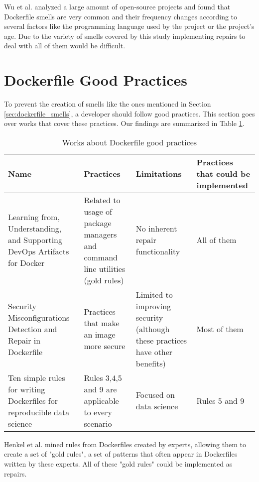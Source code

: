 Wu et al. \cite{wuCharacterizingOccurrenceDockerfile2020} analyzed a large amount of open-source projects and found that Dockerfile smells are very common and their frequency changes according to several factors like the programming language used by the project or the project's age. Due to the variety of smells covered by this study implementing repairs to deal with all of them would be difficult.

\section{Dockerfile Good Practices} \label{sec:dockerfile_good_practices}

To prevent the creation of smells like the ones mentioned in Section \ref{sec:dockerfile_smells}, a developer should follow good practices. This section goes over works that cover these practices. Our findings are summarized in Table \ref{tab:works_dockerfile_good_practices}.

\begin{table}[H]
    \centering
    \begin{tabular}{|p{}|p{}|p{}|p{}|}
        \hline \textbf{Name} & \textbf{Practices} & \textbf{Limitations} & \textbf{Practices that could be implemented} \\
        \hline Learning from, Understanding, and Supporting DevOps Artifacts for Docker \cite{henkelLearningUnderstandingSupporting2020} & Related to usage of package managers and command line utilities (gold rules) & No inherent repair functionality & All of them \\
        \hline Security Misconfigurations Detection and Repair in Dockerfile \cite{prinettoSecurityMisconfigurationsDetection} & Practices that make an image more secure & Limited to improving security (although these practices have other benefits) & Most of them \\
        \hline Ten simple rules for writing Dockerfiles for reproducible data science \cite{nustTenSimpleRules2020} & Rules 3,4,5 and 9 are applicable to every scenario & Focused on data science & Rules 5 and 9 \\
        \hline
    \end{tabular}
    \caption{Works about Dockerfile good practices}
    \label{tab:works_dockerfile_good_practices}
\end{table}

Henkel et al. \cite{henkelLearningUnderstandingSupporting2020} mined rules from Dockerfiles created by experts, allowing them to create a set of "gold rules", a set of patterns that often appear in Dockerfiles written by these experts. All of these "gold rules" could be implemented as repairs.

